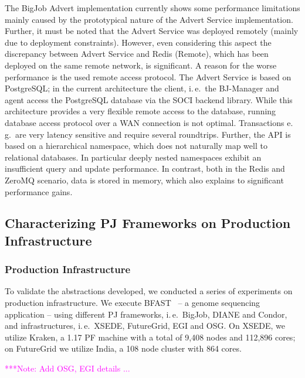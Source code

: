 \documentclass[conference,final]{IEEEtran}
\newcommand{\jhanote}[1]{ {\textcolor{red} { ***shantenu: #1 }}}
\newcommand{\alnote}[1]{ {\textcolor{blue} { ***andrel: #1 }}}
\newcommand{\note}[1]{ {\textcolor{magenta} { ***Note: #1 }}}
\newcommand{\alnote}[1]{}
\newcommand{\jhanote}[1]{}
\newcommand{\note}[1]{}
\newcommand{\upp}{\vspace*{-0.5em}}
\begin{document}
The BigJob Advert implementation currently shows some performance
limitations mainly caused by the prototypical nature of the Advert
Service implementation.  Further, it must be noted that the Advert
Service was deployed remotely (mainly due to deployment
constraints). However, even considering this aspect the discrepancy
between Advert Service and Redis (Remote), which has been deployed on
the same remote network, is significant. A reason for the worse
performance is the used remote access protocol. The Advert Service is
based on PostgreSQL; in the current architecture the client, i.\,e.\
the BJ-Manager and agent access the PostgreSQL database via the SOCI
backend library. While this architecture provides a very flexible
remote access to the database, running database access protocol over a
WAN connection is not optimal. %
Transactions e.\,g.\ are very latency sensitive and require several
roundtrips.  Further, the API is based on a hierarchical namespace,
which does not naturally map well to relational databases. In
particular deeply nested namespaces exhibit an insufficient query and
update performance. In contrast, both in the Redis and ZeroMQ
scenario, data is stored in memory, which also explains to significant
performance gains.

\upp

\subsection{Characterizing PJ Frameworks on Production Infrastructure\upp\upp}


\subsubsection*{Production Infrastructure} To validate the abstractions
developed, we conducted a series of experiments on production infrastructure. We
execute BFAST~\cite{bfast2009} -- a genome sequencing application -- using
different PJ frameworks, i.\,e.\ BigJob, DIANE and Condor, and infrastructures,
i.\,e.\ XSEDE, FutureGrid, EGI and OSG. On XSEDE, we utilize Kraken, a 1.17 PF 
machine with a total of 9,408 nodes and 112,896 cores; on FutureGrid we utilize 
India, a 108 node cluster with 864 cores.

\note{Add OSG, EGI details ...}
 
\end{document}
